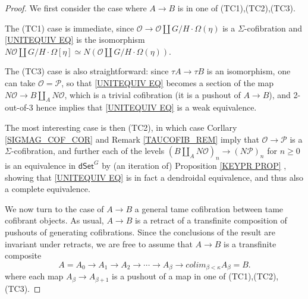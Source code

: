 \documentclass[a4paper,10pt
,draft
]{article}%
\renewcommand{\1}{\eta}%
\begin{document}
\begin{proof}
	We first consider the case where $A\to B$ is in one of (TC1),(TC2),(TC3). 
	
	The (TC1) case is immediate, 
	since $\mathcal{O} \to \mathcal{O} \amalg G/H \cdot \Omega(\eta)$ is a $\Sigma$-cofibration and
	\eqref{UNITEQUIV EQ}
	is the isomorphism
	$N\mathcal{O} \amalg G/H\cdot \Omega[\eta] \simeq 
	N\left( \mathcal{O} \amalg G/H \cdot \Omega(\eta) \right)$.

	The (TC3) case is also straightforward:
	since $\tau A \to \tau B$ is an isomorphism, one can take 
	$\mathcal{O}=\mathcal{P}$, so that 
	\eqref{UNITEQUIV EQ}
        becomes a section of the map
	$N \mathcal{O} \to B \amalg_{A} N \mathcal{O}$, which is a trivial cofibration (it is a pushout of $A \to B$),
	and 2-out-of-3 hence implies that \eqref{UNITEQUIV EQ} is a weak equivalence.

	The most interesting case is then (TC2), in which case
        Corllary \ref{SIGMAG_COF_COR} and Remark \ref{TAUCOFIB_REM}
        imply that $\mathcal{O} \to \mathcal{P}$ is a $\Sigma$-cofibration,
	and further each of the levels
        $(B \amalg_{A} N \mathcal{O})_n
        \to 
        (N \mathcal{P})_n$
        for $n \geq 0$
        is an equivalence in $\mathsf{dSet}^G$ by (an iteration of)
        Proposition \ref{KEYPR PROP} ,        
        showing that \eqref{UNITEQUIV EQ} is in fact a dendroidal equivalence, and thus also a complete equivalence.
        
        We now turn to the case of $A \to B$ a general tame cofibration between tame cofibrant objects.
	As usual, $A \to B$ is a retract of a transfinite composition of pushouts of generating cofibrations.
	Since the conclusions of the result are invariant under retracts,
	we are free to assume that $A \to B$ is a transfinite composite
\[
A = A_0 \to A_1 \to A_2 \to \cdots \to A_{\beta} \to 
colim_{\beta < \kappa} A_{\beta} = B.
\]
where each map $A_{\beta} \to A_{\beta +1}$ is a pushout of a map in one of (TC1),(TC2),(TC3).


\end{proof}
\end{document}
